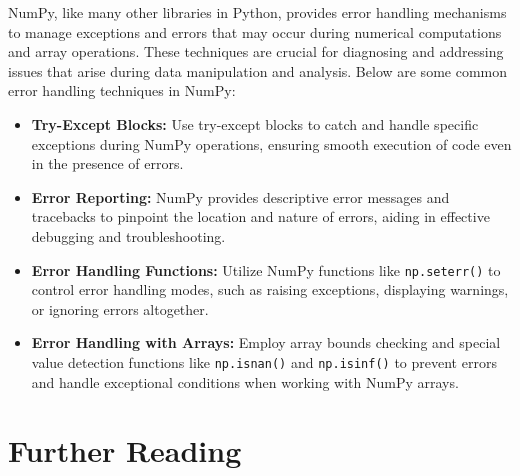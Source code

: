 NumPy, like many other libraries in Python, provides error handling mechanisms to manage exceptions and errors that may occur during numerical computations and array operations. These techniques are crucial for diagnosing and addressing issues that arise during data manipulation and analysis. Below are some common error handling techniques in NumPy:

\begin{itemize}
	\item \textbf{Try-Except Blocks:} Use try-except blocks to catch and handle specific exceptions during NumPy operations, ensuring smooth execution of code even in the presence of errors.
	\item \textbf{Error Reporting:} NumPy provides descriptive error messages and tracebacks to pinpoint the location and nature of errors, aiding in effective debugging and troubleshooting.
	\item \textbf{Error Handling Functions:} Utilize NumPy functions like \texttt{np.seterr()} to control error handling modes, such as raising exceptions, displaying warnings, or ignoring errors altogether.
	\item \textbf{Error Handling with Arrays:} Employ array bounds checking and special value detection functions like \texttt{np.isnan()} and \texttt{np.isinf()} to prevent errors and handle exceptional conditions when working with NumPy arrays.
\end{itemize}


\section{Further Reading}

